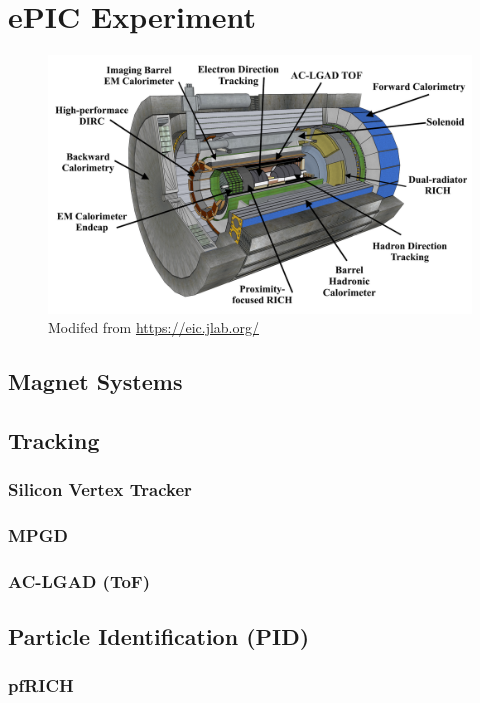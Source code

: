 \chapter{ePIC Experiment}\label{cha:epic} %
\begin{figure}[H]
    \centering
    \includegraphics[width=.9\linewidth]{img/ePIC_skp.png}
    \caption{Modifed from \url{https://eic.jlab.org/}}
    \label{fig:epic:epic}
\end{figure}

\section{Magnet Systems}

\section{Tracking}
\subsection{Silicon Vertex Tracker}
\subsection{MPGD}
\subsection{AC-LGAD (ToF)}

\section{Particle Identification (PID)}
\subsection{pfRICH}
